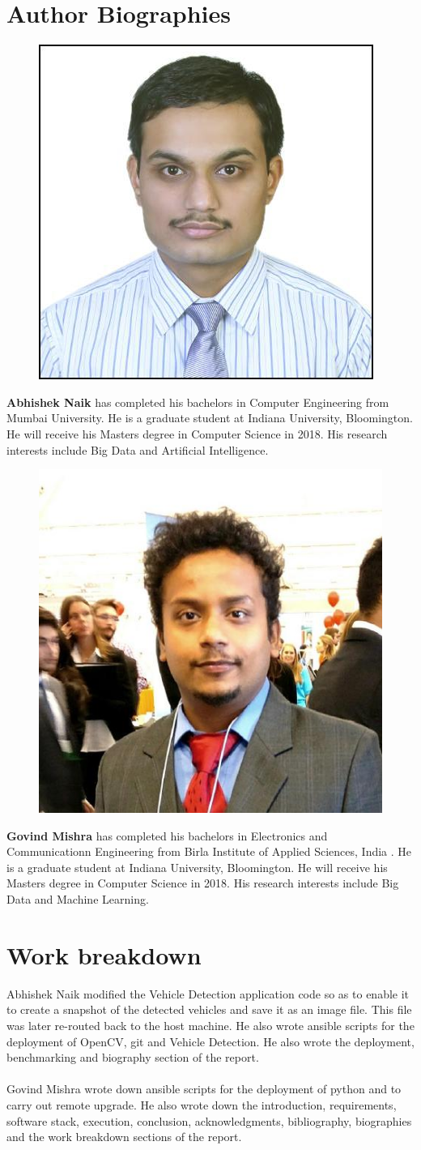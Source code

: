 \documentclass[9pt,twocolumn,twoside]{../../styles/osajnl}
\begin{document}
\section*{Author Biographies}
\begingroup \setlength\intextsep{0pt}
\begin{minipage}[t][3.2cm][t]{1.0\columnwidth}
  \begin{figure}
    \includegraphics[width=0.25\columnwidth]{images/abhisheknaik.jpeg}
  \end{figure}
  \noindent
  {\bfseries Abhishek Naik} has completed his bachelors in Computer Engineering from Mumbai University. He is a graduate student at Indiana
  University, Bloomington. He will receive his Masters degree in Computer Science in
  2018. His research interests include Big Data and Artificial Intelligence.
\end{minipage}
\begin{minipage}[t][3.2cm][t]{1.0\columnwidth}
  \begin{figure}
    \includegraphics[width=0.25\columnwidth]{images/govindmishra.jpeg}
  \end{figure}
  \noindent
  {\bfseries Govind Mishra} has completed his bachelors in Electronics
  and Communicationn Engineering from Birla Institute of Applied
  Sciences, India . He is a graduate student at Indiana University,
  Bloomington. He will receive his Masters degree in Computer Science
  in 2018. His research interests include Big Data and Machine
  Learning.
\end{minipage}
\endgroup \appendix

\section{Work breakdown}
Abhishek Naik modified the Vehicle Detection application code so as to
enable it to create a snapshot of the detected vehicles and save it as
an image file.  This file was later re-routed back to the host
machine.  He also wrote ansible scripts for the deployment of OpenCV,
git and Vehicle Detection.  He also wrote the deployment, benchmarking
and biography section of the report.\\ \\ Govind Mishra wrote down
ansible scripts for the deployment of python and to carry out remote
upgrade.  He also wrote down the introduction, requirements, software
stack, execution, conclusion, acknowledgments, bibliography,
biographies and the work breakdown sections of the report.
\end{document}
